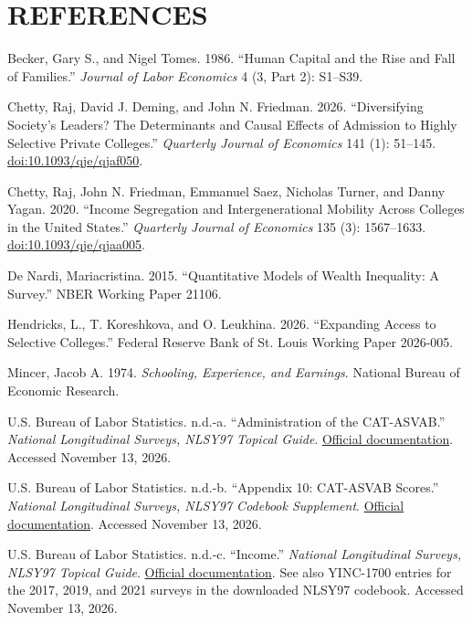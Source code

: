 \documentclass[12pt,letterpaper]{article}
\begin{document}
\section*{REFERENCES}
\begin{list}{}{\setlength{\leftmargin}{0.3in}
              \setlength{\itemindent}{-0.3in}
              \setlength{\itemsep}{0.6\baselineskip}
              \setlength{\parsep}{0pt}}
\item Becker, Gary S., and Nigel Tomes. 1986. ``Human Capital and the Rise and Fall of Families.'' \textit{Journal of Labor Economics} 4 (3, Part 2): S1--S39.
\item Chetty, Raj, David J. Deming, and John N. Friedman. 2026. ``Diversifying Society's Leaders? The Determinants and Causal Effects of Admission to Highly Selective Private Colleges.'' \textit{Quarterly Journal of Economics} 141 (1): 51--145. \href{https://doi.org/10.1093/qje/qjaf050}{doi:10.1093/qje/qjaf050}.
\item Chetty, Raj, John N. Friedman, Emmanuel Saez, Nicholas Turner, and Danny Yagan. 2020. ``Income Segregation and Intergenerational Mobility Across Colleges in the United States.'' \textit{Quarterly Journal of Economics} 135 (3): 1567--1633. \href{https://doi.org/10.1093/qje/qjaa005}{doi:10.1093/qje/qjaa005}.
\item De Nardi, Mariacristina. 2015. ``Quantitative Models of Wealth Inequality: A Survey.'' NBER Working Paper 21106.
\item Hendricks, L., T. Koreshkova, and O. Leukhina. 2026. ``Expanding Access to Selective Colleges.'' Federal Reserve Bank of St. Louis Working Paper 2026-005.
\item Mincer, Jacob A. 1974. \textit{Schooling, Experience, and Earnings}. National Bureau of Economic Research.
\item U.S. Bureau of Labor Statistics. n.d.-a. ``Administration of the CAT-ASVAB.'' \textit{National Longitudinal Surveys, NLSY97 Topical Guide}. \href{https://nlsinfo.org/content/cohorts/nlsy97/topical-guide/education/administration-cat-asvab-0}{Official documentation}. Accessed November 13, 2026.
\item U.S. Bureau of Labor Statistics. n.d.-b. ``Appendix 10: CAT-ASVAB Scores.'' \textit{National Longitudinal Surveys, NLSY97 Codebook Supplement}. \href{https://nlsinfo.org/content/cohorts/nlsy97/other-documentation/codebook-supplement/appendix-10-cat-asvab-scores}{Official documentation}. Accessed November 13, 2026.
\item U.S. Bureau of Labor Statistics. n.d.-c. ``Income.'' \textit{National Longitudinal Surveys, NLSY97 Topical Guide}. \href{https://nlsinfo.org/content/cohorts/nlsy97/topical-guide/income/income}{Official documentation}. See also YINC-1700 entries for the 2017, 2019, and 2021 surveys in the downloaded NLSY97 codebook. Accessed November 13, 2026.
\end{list}
\end{document}
